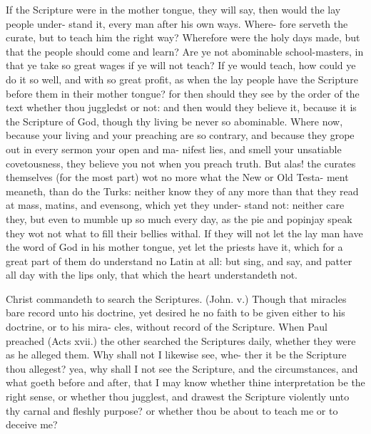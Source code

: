 \documentclass{custom}
\begin{document}
If the Scripture were in the mother tongue,
they will say, then would the lay people under-
stand it, every man after his own ways. Where- 
fore serveth the curate, but to teach him the 
right way? Wherefore were the holy days 
made, but that the people should come and learn? 
Are ye not abominable school-masters, in that ye 
take so great wages if ye will not teach? If ye 
would teach, how could ye do it so well, and 
with so great profit, as when the lay people have 
the Scripture before them in their mother tongue?
for then should they see by the order of the text 
whether thou juggledst or not: and then would 
they believe it, because it is the Scripture of God, 
though thy living be never so abominable.
Where now, because your living and your 
preaching are so contrary, and because they 
grope out in every sermon your open and ma- 
nifest lies, and smell your unsatiable covetousness,
they believe you not when you preach truth. 
But alas! the curates themselves (for the most 
part) wot no more what the New or Old Testa- 
ment meaneth, than do the Turks: neither know 
they of any more than that they read at mass, 
matins, and evensong, which yet they under- 
stand not: neither care they, but even to mumble 
up so much every day, as the pie and popinjay 
speak they wot not what to fill their bellies 
withal. If they will not let the lay man have 
the word of God in his mother tongue, yet let 
the priests have it, which for a great part of them 
do understand no Latin at all: but sing, and say, 
and patter all day with the lips only, that which 
the heart understandeth not. 


Christ commandeth to search the Scriptures.
(John. v.) Though that miracles bare record 
unto his doctrine, yet desired he no faith to be 
given either to his doctrine, or to his mira- 
cles, without record of the Scripture. When 
Paul preached (Acts xvii.) the other searched 
the Scriptures daily, whether they were as he 
alleged them. Why shall not I likewise see, whe-
ther it be the Scripture thou allegest? yea, why 
shall I not see the Scripture, and the circumstances, 
and what goeth before and after, that I may 
know whether thine interpretation be the right 
sense, or whether thou jugglest, and drawest the 
Scripture violently unto thy carnal and fleshly 
purpose? or whether thou be about to teach me 
or to deceive me? 
\end{document}
